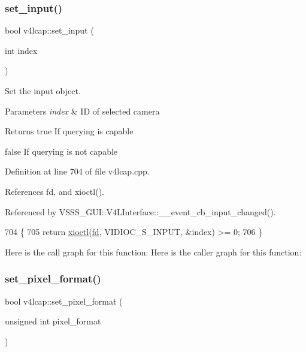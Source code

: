 \subsubsection{\texorpdfstring{set\+\_\+input()}{set\_input()}}
{\footnotesize\ttfamily bool v4lcap\+::set\+\_\+input (\begin{DoxyParamCaption}\item[{int}]{index }\end{DoxyParamCaption})}



Set the input object. 


\begin{DoxyParams}{Parameters}
{\em index} & ID of selected camera \\
\hline
\end{DoxyParams}
\begin{DoxyReturn}{Returns}
true If querying is capable 

false If querying is not capable 
\end{DoxyReturn}


Definition at line 704 of file v4lcap.\+cpp.



References fd, and xioctl().



Referenced by V\+S\+S\+S\+\_\+\+G\+U\+I\+::\+V4\+L\+Interface\+::\+\_\+\+\_\+event\+\_\+cb\+\_\+input\+\_\+changed().


\begin{DoxyCode}
704                                 \{
705     \textcolor{keywordflow}{return} \hyperlink{classv4lcap_ab5aaa5a8c0df17f5ca57e0b5170232cb}{xioctl}(\hyperlink{classv4lcap_a38109593bde997dad13b3a461569573d}{fd}, VIDIOC\_S\_INPUT, &index) >= 0;
706 \}
\end{DoxyCode}
Here is the call graph for this function\+:
Here is the caller graph for this function\+:
\mbox{\label{classv4lcap_a7da8705c4a542bb1118f74435957c471}} 
\subsubsection{\texorpdfstring{set\+\_\+pixel\+\_\+format()}{set\_pixel\_format()}}
{\footnotesize\ttfamily bool v4lcap\+::set\+\_\+pixel\+\_\+format (\begin{DoxyParamCaption}\item[{unsigned int}]{pixel\+\_\+format }\end{DoxyParamCaption})}



